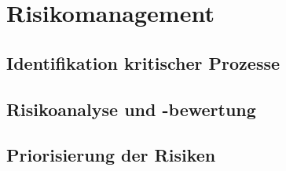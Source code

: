\section{Risikomanagement}
\subsection{Identifikation kritischer Prozesse}
\subsection{Risikoanalyse und -bewertung}
\subsection{Priorisierung der Risiken}